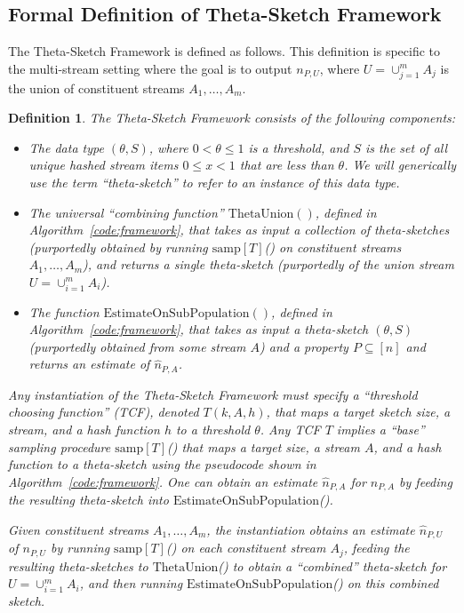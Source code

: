 \documentclass{article}
\newtheorem{definition}[theorem]{Definition}
\newcommand{\romTS}{\hat{n}}
\newcommand{\estonsub}{\mathrm{EstimateOnSubPopulation}}
\newcommand{\thetaunion}{\mathrm{ThetaUnion}}
\newcommand{\samp}{\mathrm{samp}}
\begin{document}
\subsection{Formal Definition of Theta-Sketch Framework}
\label{app:framework}
The Theta-Sketch Framework is defined as follows. This definition is specific to the multi-stream setting where the goal is to output $n_{P, U}$, where $U=\cup_{j=1}^m A_j$ is the union of constituent streams $A_1, \dots, A_m$.
\begin{definition} \label{def:tsf}
The Theta-Sketch Framework consists of the following components:
 \begin{itemize}
  \item The data type $(\theta, S)$, where $0 < \theta \le 1$ is a 
   threshold, and $S$ is the set of all unique hashed stream items
   $0 \le x < 1$ that are less than $\theta$. We will generically use the term ``theta-sketch'' to refer to an instance
   of this data type.
  \item The universal ``combining function'' $\thetaunion()$, defined in Algorithm~\ref{code:framework}, that takes as input a 
  collection of theta-sketches (purportedly obtained by running $\mathrm{\samp}[T]$() on constituent streams $A_1, \dots, A_m$),
  and returns a single theta-sketch (purportedly of the union stream $U = \cup_{i=1}^m A_i$).
  \item The function $\estonsub()$, defined in Algorithm~\ref{code:framework},
  that takes as input a theta-sketch $(\theta,S)$ (purportedly obtained from some stream $A$) and a property $P\subseteq [n]$
  and returns an estimate of $\romTS_{P, A}$.
\end{itemize}
  Any instantiation of the Theta-Sketch Framework must specify a ``threshold choosing function'' (TCF), denoted $T(k,A, h)$,
   that maps a target sketch size, a stream, and a hash function $h$ to a threshold $\theta$. 
   Any TCF $T$ implies a ``base'' sampling procedure $\mathrm{\samp}[T]$() that maps a target size, a stream $A$, and a hash function to a theta-sketch
  using the pseudocode shown in Algorithm~\ref{code:framework}. One can obtain an estimate $\romTS_{P, A}$ for $n_{P, A}$ by feeding the resulting theta-sketch
  into $\estonsub$().
  
  Given constituent streams $A_1, \dots, A_m$, the instantiation obtains an estimate $\romTS_{P, U}$ of $n_{P, U}$ by running $\mathrm{\samp}[T]$() 
  on each constituent stream $A_j$, feeding the resulting theta-sketches to $\thetaunion$() to obtain a ``combined'' theta-sketch for $U=\cup_{i=1}^m A_i$, and then running
  $\estonsub$()  on this combined sketch. 
\end{definition}
\end{document}
